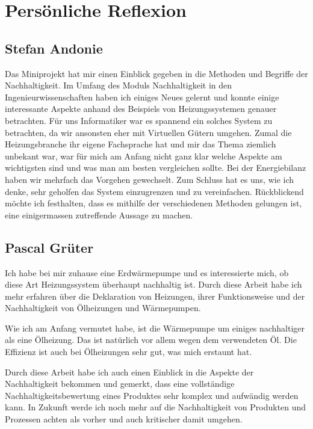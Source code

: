 \chapter{Persönliche Reflexion}
\label{chap:reflexion}

\section{Stefan Andonie}

Das Miniprojekt hat mir einen Einblick gegeben in die Methoden und Begriffe
der Nachhaltigkeit.
Im Umfang des Moduls Nachhaltigkeit in den Ingenieurwissenschaften haben ich
einiges Neues gelernt und konnte einige interessante Aspekte anhand
des Beispiels von Heizungssystemen genauer betrachten.
Für uns Informatiker war es spannend ein solches System zu betrachten, da wir
ansonsten eher mit Virtuellen Gütern umgehen.
Zumal die Heizungsbranche ihr eigene Fachsprache hat und mir das Thema ziemlich
unbekant war, war für mich am Anfang nicht ganz klar welche Aspekte am
wichtigsten sind und was man am besten vergleichen sollte.
Bei der Energiebilanz haben wir mehrfach das Vorgehen gewechselt.
Zum Schluss hat es uns, wie ich denke, sehr geholfen das System einzugrenzen und zu
vereinfachen.
Rückblickend möchte ich festhalten, dass es mithilfe der verschiedenen Methoden
gelungen ist, eine einigermassen zutreffende Aussage zu machen.

\section{Pascal Grüter}

Ich habe bei mir zuhause eine Erdwärmepumpe und es interessierte mich, ob diese Art Heizungssystem überhaupt nachhaltig ist. Durch diese Arbeit habe ich mehr erfahren über die Deklaration von Heizungen, ihrer Funktionsweise und der Nachhaltigkeit von Ölheizungen und Wärmepumpen.

Wie ich am Anfang vermutet habe, ist die Wärmepumpe um einiges nachhaltiger als eine Ölheizung. Das ist natürlich vor allem wegen dem verwendeten Öl. Die Effizienz ist auch bei Ölheizungen sehr gut, was mich erstaunt hat.

Durch diese Arbeit habe ich auch einen Einblick in die Aspekte der Nachhaltigkeit bekommen und gemerkt, dass eine vollständige Nachhaltigkeitsbewertung eines Produktes sehr komplex und aufwändig werden kann.
In Zukunft werde ich noch mehr auf die Nachhaltigkeit von Produkten und Prozessen achten als vorher und auch kritischer damit umgehen.
